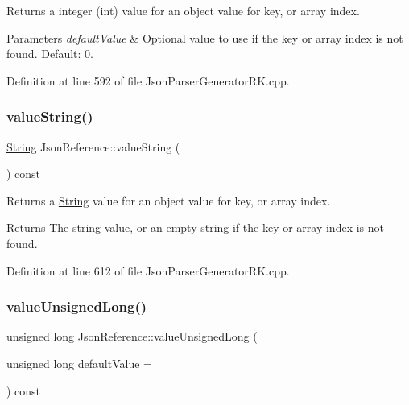 Returns a integer (int) value for an object value for key, or array index. 


\begin{DoxyParams}{Parameters}
{\em default\+Value} & Optional value to use if the key or array index is not found. Default\+: 0. \\
\hline
\end{DoxyParams}


Definition at line 592 of file Json\+Parser\+Generator\+R\+K.\+cpp.

\mbox{\label{class_json_reference_ab9dfec23570193b9ab1d16b07fba6022}} 
\subsubsection{\texorpdfstring{value\+String()}{valueString()}}
{\footnotesize\ttfamily \hyperlink{class_string}{String} Json\+Reference\+::value\+String (\begin{DoxyParamCaption}{ }\end{DoxyParamCaption}) const}



Returns a \hyperlink{class_string}{String} value for an object value for key, or array index. 

\begin{DoxyReturn}{Returns}
The string value, or an empty string if the key or array index is not found. 
\end{DoxyReturn}


Definition at line 612 of file Json\+Parser\+Generator\+R\+K.\+cpp.

\mbox{\label{class_json_reference_a081b56c80097d802911610fb17253211}} 
\subsubsection{\texorpdfstring{value\+Unsigned\+Long()}{valueUnsignedLong()}}
{\footnotesize\ttfamily unsigned long Json\+Reference\+::value\+Unsigned\+Long (\begin{DoxyParamCaption}\item[{unsigned long}]{default\+Value = {} }\end{DoxyParamCaption}) const}



